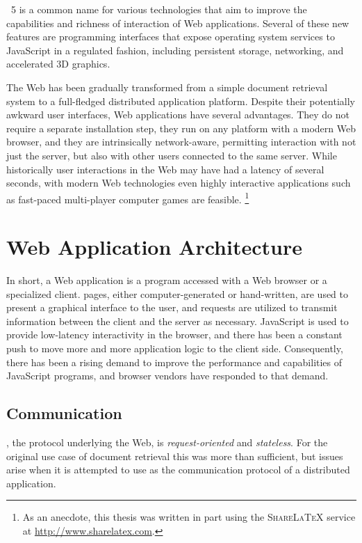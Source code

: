 ~5 is a common name for various technologies that aim to improve the capabilities and richness of interaction of Web applications. Several of these new features are programming interfaces that expose operating system services to JavaScript in a regulated fashion, including persistent storage, networking, and accelerated 3D graphics. \cite{HTML5}

The Web has been gradually transformed from a simple document retrieval system to a full-fledged distributed application platform. Despite their potentially awkward user interfaces, Web applications have several advantages. They do not require a separate installation step, they run on any platform with a modern Web browser, and they are intrinsically network-aware, permitting interaction with not just the server, but also with other users connected to the same server. While historically user interactions in the Web may have had a latency of several seconds, with modern Web technologies even highly interactive applications such as fast-paced multi-player computer games are feasible. \footnote{As an anecdote, this thesis was written in part using the \textsc{Share\LaTeX} service at \url{http://www.sharelatex.com}.}

\section{Web Application Architecture}

In short, a Web application is a program accessed with a Web browser or a specialized  client.  pages, either computer-generated or hand-written, are used to present a graphical interface to the user, and  requests are utilized to transmit information between the client and the server as necessary. JavaScript is used to provide low-latency interactivity in the browser, and there has been a constant push to move more and more application logic to the client side. Consequently, there has been a rising demand to improve the performance and capabilities of JavaScript programs, and browser vendors have responded to that demand.

\subsection{Communication}

, the protocol underlying the Web, is \emph{request-oriented} and \emph{stateless}. For the original use case of document retrieval this was more than sufficient, but issues arise when it is attempted to use as the communication protocol of a distributed application.

